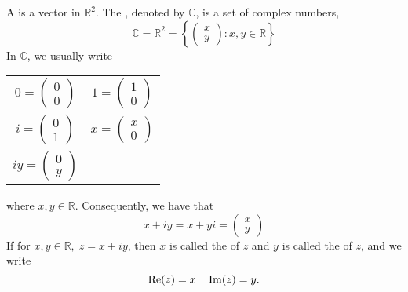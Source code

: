 \documentclass[11pt, oneside]{book}
\begin{document}
\begin{defn}\label{defn:Complex Number, Complex Plane}
	A  is a vector in $\mathbb{R}^2$. The , denoted by $\mathbb{C}$, is a set of complex numbers,
	\begin{equation*}
		\mathbb{C} = \mathbb{R}^2 = \left\{ \begin{pmatrix} x \\ y \end{pmatrix} : x , y \in \mathbb{R} \right\}
	\end{equation*}
	In $\mathbb{C}$, we usually write \\
	\begin{center}
		\begin{tabular}{c c}
			$0 = \begin{pmatrix} 0 \\ 0 \end{pmatrix}$ & $1 = \begin{pmatrix} 1 \\ 0 \end{pmatrix}$ \\
			$i = \begin{pmatrix} 0 \\ 1 \end{pmatrix}$ & $x = \begin{pmatrix} x \\ 0 \end{pmatrix}$ \\
			$iy = \begin{pmatrix} 0 \\ y \end{pmatrix}$
		\end{tabular}
	\end{center}
	where $x, y \in \mathbb{R}$. Consequently, we have that
	\begin{equation*}
		x + iy = x + yi = \begin{pmatrix} x \\ y \end{pmatrix}
	\end{equation*}
	If for $x, y \in \mathbb{R}, \; z = x + iy$, then $x$ is called the  of $z$ and $y$ is called the  of $z$, and we write
	\begin{equation*}
		\operatorname{Re}(z) = x \quad \operatorname{Im}(z) = y.
	\end{equation*}
\end{defn}
\end{document}
